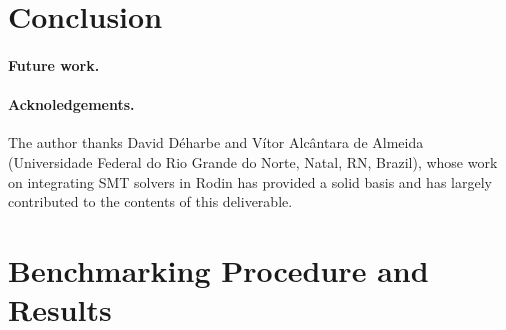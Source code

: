 \documentclass[10pt,a4paper]{report}
\begin{document}





\section{Conclusion}

\paragraph{Future work.} 

\paragraph{Acknoledgements.} 
The author thanks David D\'eharbe and V\'itor Alc\^antara de Almeida (Universidade Federal do Rio Grande do Norte, Natal, RN, Brazil), whose work on integrating SMT solvers in Rodin \cite{RODINSMT10} has provided a solid basis and has largely contributed to the contents of this deliverable.

\nocite{*}



\appendix
\makeatletter
\def\@seccntformat#1{Appendix~\csname the#1\endcsname:\quad}
\makeatother
\section{Benchmarking Procedure and Results}
\label{Bench}

     
\end{document}
